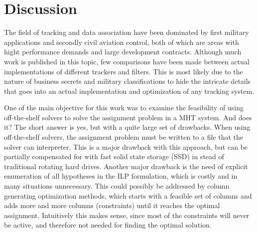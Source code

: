 \section{Discussion}
\label{sec:discussion}
The field of tracking and data association have been dominated by first military applications and secondly civil aviation control, both of which are areas with hight performance demands and large development contracts. Although much work is published in this topic, few comparisons have been made between actual implementations of different trackers and filters. This is most likely due to the nature of business secrets and military classifications to hide the intricate details that goes into an actual implementation and optimization of any tracking system.

One of the main objective for this work was to examine the feasibility of using off-the-shelf solvers to solve the assignment problem in a MHT system. And does it? The short answer is yes, but with a quite large set of drawbacks. When using off-the-shelf solvers, the assignment problem must be written to a file that the solver can interpreter. This is a major drawback with this approach, but can be partially compensated for with fast solid state storage (SSD) in stead of traditional rotating hard drives. Another major drawback is the need of explicit enumeration of all hypotheses in the ILP formulation, which is costly and in many situations unnecessary. This could possibly be addressed by column generating optimization methods, which starts with a feasible set of columns and adds more and more columns (constraints) until it reaches the optimal assignment. Intuitively this makes sense, since most of the constraints will never be active, and therefore not needed for finding the optimal solution.


